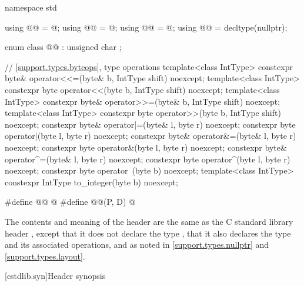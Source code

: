 \begin{codeblock}
namespace std {
  using @@ = @\seebelow@;
  using @@ = @\seebelow@;
  using @@ = @\seebelow@;
  using @@ = decltype(nullptr);

  enum class @@ : unsigned char {};

  // \ref{support.types.byteops},  type operations
  template<class IntType>
    constexpr byte& operator<<=(byte& b, IntType shift) noexcept;
  template<class IntType>
    constexpr byte operator<<(byte b, IntType shift) noexcept;
  template<class IntType>
    constexpr byte& operator>>=(byte& b, IntType shift) noexcept;
  template<class IntType>
    constexpr byte operator>>(byte b, IntType shift) noexcept;
  constexpr byte& operator|=(byte& l, byte r) noexcept;
  constexpr byte operator|(byte l, byte r) noexcept;
  constexpr byte& operator&=(byte& l, byte r) noexcept;
  constexpr byte operator&(byte l, byte r) noexcept;
  constexpr byte& operator^=(byte& l, byte r) noexcept;
  constexpr byte operator^(byte l, byte r) noexcept;
  constexpr byte operator~(byte b) noexcept;
  template<class IntType>
    constexpr IntType to_integer(byte b) noexcept;
}

#define @@ @\seebelow@
#define @@(P, D) @\seebelow@
\end{codeblock}

\pnum
The contents and meaning of the header  are the same as
the C standard library header ,
except that it does not declare the type ,
that it also declares the type 
and its associated operations,
and as noted in
\ref{support.types.nullptr} and
\ref{support.types.layout}.


[cstdlib.syn]{Header  synopsis}

